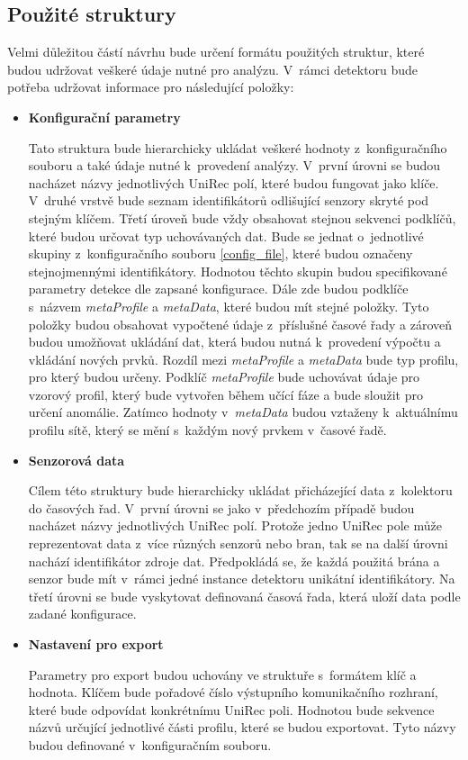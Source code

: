  \subsection{Použité struktury}
 Velmi důležitou částí návrhu bude určení formátu použitých struktur, které budou udržovat veškeré 
 údaje nutné pro analýzu. V~rámci detektoru bude potřeba udržovat informace pro následující
 položky:
  \begin{itemize}
   \item \textbf{Konfigurační parametry} \label{configParam}
   
   Tato struktura bude hierarchicky ukládat veškeré hodnoty z~konfiguračního souboru
   a také údaje nutné k~provedení analýzy. V~první úrovni se budou nacházet názvy jednotlivých 
   UniRec polí, které budou fungovat jako klíče. V~druhé vrstvě bude seznam identifikátorů 
   odlišující senzory skryté pod stejným klíčem.
   Třetí úroveň bude vždy obsahovat stejnou 
   sekvenci podklíčů, které budou určovat typ uchovávaných dat. Bude se jednat o~jednotlivé 
   skupiny z~konfiguračního souboru \ref{config_file}, které budou označeny stejnojmennými
   identifikátory. Hodnotou těchto skupin budou specifikované parametry detekce dle zapsané
   konfigurace. Dále zde budou podklíče s~názvem \textit{metaProfile} a \textit{metaData},
   které budou mít
   stejné položky. Tyto položky budou obsahovat vypočtené údaje z~příslušné časové řady
   a zároveň budou umožňovat ukládání dat, která budou nutná k~provedení výpočtu 
   a vkládání nových prvků. Rozdíl mezi \textit{metaProfile} a \textit{metaData} bude typ profilu,
   pro který budou určeny. Podklíč \textit{metaProfile} bude uchovávat údaje pro vzorový profil,
   který bude vytvořen během učící fáze a bude sloužit pro určení anomálie. Zatímco 
   hodnoty v~\textit{metaData} budou vztaženy k~aktuálnímu profilu sítě, který se mění s~každým
   nový prvkem v~časové řadě.
   
   \item \textbf{Senzorová data}
   
   Cílem této struktury bude hierarchicky ukládat přicházející data z~kolektoru do časových řad. 
   V~první úrovni se jako v~předchozím případě budou nacházet názvy jednotlivých UniRec polí. 
   Protože jedno UniRec pole může reprezentovat data z~více různých senzorů nebo bran, tak se na 
   další úrovni nachází identifikátor zdroje dat. Předpokládá se, že každá použitá brána a senzor 
   bude mít v~rámci jedné instance detektoru unikátní identifikátory. Na třetí úrovni se bude vyskytovat 
   definovaná časová řada, která uloží data podle zadané konfigurace.
   
   \item \textbf{Nastavení pro export} 
   
   Parametry pro export budou uchovány ve struktuře s~formátem klíč a hodnota. Klíčem bude 
   pořadové číslo výstupního komunikačního rozhraní, které bude odpovídat konkrétnímu UniRec poli. Hodnotou 
   bude sekvence názvů určující jednotlivé části profilu, které se budou exportovat. Tyto názvy
   budou definované v~konfiguračním souboru. 
   
  \end{itemize}

